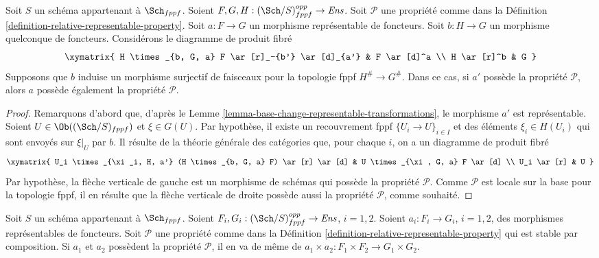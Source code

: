 \begin{lemma}
\label{lemma-descent-representable-transformations-property}
Soit $S$ un schéma appartenant à $\Sch_{fppf}$.
Soient $F, G, H : (\Sch/S)_{fppf}^{opp} \to \textit{Ens}$.
Soit $\mathcal{P}$ une propriété comme dans la
Définition \ref{definition-relative-representable-property}.
Soit $a : F \to G$ un morphisme représentable de foncteurs.
Soit $b : H \to G$ un morphisme quelconque de foncteurs.
Considérons le diagramme de produit fibré
$$
\xymatrix{
H \times_{b, G, a} F \ar[r]_-{b'} \ar[d]_{a'} & F \ar[d]^a \\
H \ar[r]^b & G
}
$$
Supposons que $b$ induise un morphisme surjectif de faisceaux pour la topologie fppf $H^\# \to G^\#$.
Dans ce cas, si $a'$ possède la propriété $\mathcal{P}$, alors $a$
possède également la propriété $\mathcal{P}$.
\end{lemma}

\begin{proof}
Remarquons d'abord que, d'après le
Lemme \ref{lemma-base-change-representable-transformations},
le morphisme $a'$ est représentable.
Soient $U \in \Ob((\Sch/S)_{fppf})$ et
$\xi \in G(U)$. Par hypothèse, il existe un recouvrement fppf
$\{U_i \to U\}_{i \in I}$ et des éléments $\xi_i \in H(U_i)$
qui sont envoyés sur $\xi|_U$ par $b$. Il résulte de la théorie générale des catégories que, pour
chaque $i$, on a un diagramme de produit fibré
$$
\xymatrix{
U_i \times_{\xi_i, H, a'} (H \times_{b, G, a} F) \ar[r] \ar[d] &
U \times_{\xi, G, a} F \ar[d] \\
U_i \ar[r] & U
}
$$
Par hypothèse, la flèche verticale de gauche est un morphisme de schémas qui
possède la propriété $\mathcal{P}$. Comme $\mathcal{P}$ est locale sur la base pour la
topologie fppf, il en résulte que la flèche verticale de droite possède aussi la propriété
$\mathcal{P}$, comme souhaité.
\end{proof}

\begin{lemma}
\label{lemma-product-representable-transformations-property}
Soit $S$ un schéma appartenant à $\Sch_{fppf}$.
Soient $F_i, G_i : (\Sch/S)_{fppf}^{opp} \to \textit{Ens}$,
$i = 1, 2$.
Soient $a_i : F_i \to G_i$, $i = 1, 2$, des morphismes représentables
de foncteurs.
Soit $\mathcal{P}$ une propriété comme dans la
Définition \ref{definition-relative-representable-property}
qui est stable par composition.
Si $a_1$ et $a_2$ possèdent la propriété $\mathcal{P}$, il en va de même de
$a_1 \times a_2 : F_1 \times F_2 \longrightarrow G_1 \times G_2$.
\end{lemma}

